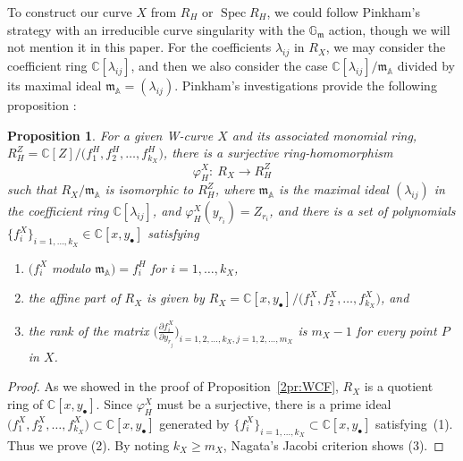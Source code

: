 \documentclass[10pt,a4paper]{amsart}
\def\bA{{\mathbb A}}
\def\CC{{\mathbb C}}
\def\GG{{\mathbb G}}
\def\fm{{\mathfrak m}}
\def\Spec{\operatorname{Spec}}
\numberwithin{equation}{section}
\newtheorem{Proposition}[Theorem]{Proposition}
 { \theoremstyle{definition}
\newtheorem{Definition}[Theorem]{Definition}
\newtheorem{Note}[Theorem]{Note}
\newtheorem{Example}[Theorem]{Example}
\newtheorem{Remark}[Theorem]{Remark} }
\begin{document}
To construct our curve $X$ from $R_H$ or $\Spec R_H$, we could follow Pinkham's strategy \cite{Pinkham74} with an irreducible curve singularity with the $\GG_\fm$ action, though we will not mention it in this paper.
For the coefficients $\lambda_{ij}$ in $R_X$, we may consider the coefficient ring $\CC[\lambda_{ij}]$, and then we also consider the case $\CC[\lambda_{ij}]/\fm_{\bA}$ divided by its maximal ideal $\fm_{\bA}=(\lambda_{ij})$.
Pinkham's investigations provide the following proposition \cite{Pinkham74}:
\begin{Proposition} \label{2pr:R_H^Z}
For a given W-curve $X$ and its associated monomial ring,
$R_H^Z = \CC[Z]/ \big(f^H_1, \allowbreak f^H_2, \dots, f^H_{k_X}\big)$, there is a surjective ring-homomorphism {\rm \cite[p.~80]{ADGS2016}}
\[
\varphi^X_H\colon\ R_X \to R_H^Z
\]
such that $R_X/\fm_{\bA}$ is isomorphic to $R_H^Z$, where $\fm_{\bA}$ is the maximal ideal $(\lambda_{ij})$ in the coefficient ring $\CC[\lambda_{ij}]$, and $\varphi^X_H(y_{r_i})=Z_{r_i}$, and there is a set of polynomials $\{f^{X}_i\}_{i = 1, \dots, k_X}\in \CC[x,y_\bullet]$ satisfying
\begin{enumerate}\itemsep=0pt
\item[$(1)$] $\big(f^X_i$ modulo $\fm_{\bA}\big)=f^H_i$ for $i=1,\dots,k_X$,

\item[$(2)$]
the affine part of $R_X$ is given by $R_X=\CC[x,y_{\bullet}]/\big(f^X_1, f^X_2, \dots, f^X_{k_X}\big)$, and

\item[$(3)$] the rank of the matrix
$\big(\frac{\partial f^X_i}{\partial y_{r_j}}\big)_{
i=1, 2, \dots, k_X, j = 1, 2, \dots, m_X}$ is $m_X-1$ for every point $P$ in $X$.
\end{enumerate}
\end{Proposition}

\begin{proof}As we showed in the proof of Proposition~\ref{2pr:WCF}, $R_X$ is a quotient ring of $\CC[x,y_{\bullet}]$.
Since $\varphi_H^X$ must be a surjective, there is a prime ideal $\big(f^X_1, f^X_2, \dots, f^X_{k_X}\big)\subset \CC[x,y_\bullet]$ generated by $\big\{f^{X}_i\big\}_{i = 1, \dots, k_X}\subset \CC[x,y_\bullet]$ satisfying~(1).
Thus we prove (2).
By noting $k_X\ge m_X$, Nagata's Jacobi criterion \cite[Theorem~30.10]{Matsumura} shows (3).
\end{proof}
\end{document}
